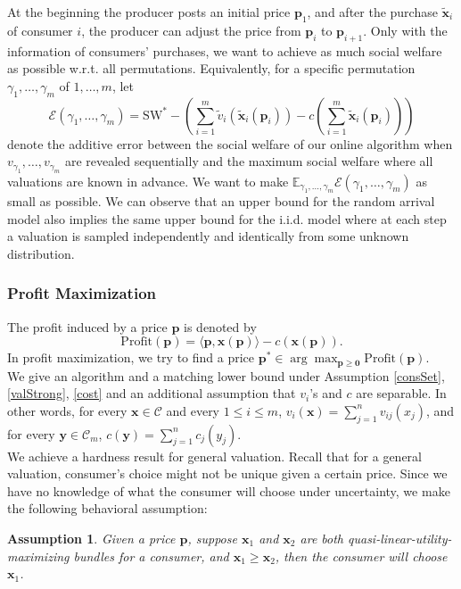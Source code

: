 \documentclass{article}
\newtheorem{assumption}{Assumption}[section]
\begin{document}
At the beginning the producer posts an initial price $\mathbf{p}_1$, and after the purchase $\tilde{\mathbf{x}}_i$ of consumer $i$, the producer can adjust the price from $\mathbf{p}_i$ to $\mathbf{p}_{i+1}$. Only with the information of consumers' purchases, we want to achieve as much social welfare as possible w.r.t. all permutations. Equivalently, for a specific permutation $\gamma_1,\ldots,\gamma_m$ of $1,\ldots,m$, let
\begin{equation}
    \mathcal{E}(\gamma_1,\ldots,\gamma_m)=\mathrm{SW}^*-\left(\sum_{i=1}^{m}\tilde{v}_i(\tilde{\mathbf{x}}_i(\mathbf{p}_i))-c\left(\sum_{i=1}^{m}\tilde{\mathbf{x}}_i(\mathbf{p}_i)\right)\right)
\end{equation}
denote the additive error between the social welfare of our online algorithm when $v_{\gamma_1},\ldots,v_{\gamma_m}$ are revealed sequentially and the maximum social welfare where all valuations are known in advance. We want to make $\mathbb{E}_{\gamma_1,\ldots,\gamma_m}\mathcal{E}(\gamma_1,\ldots,\gamma_m)$ as small as possible. We can observe that an upper bound for the random arrival model also implies the same upper bound for the i.i.d. model where at each step a valuation is sampled independently and identically from some unknown distribution.

\subsubsection{Profit Maximization}\label{profitMaxSection}
The profit induced by a price $\mathbf{p}$ is denoted by
\begin{equation}
    \mathrm{Profit}(\mathbf{p})=\langle \mathbf{p},\mathbf{x}(\mathbf{p})\rangle-c(\mathbf{x}(\mathbf{p})).
\end{equation}
In profit maximization, we try to find a price $\mathbf{p}^*\in\arg\max_{\mathbf{p}\ge \mathbf{0}}\mathrm{Profit}(\mathbf{p})$. \\

We give an algorithm and a matching lower bound under Assumption \ref{consSet}, \ref{valStrong}, \ref{cost} and an additional assumption that $v_i$'s and $c$ are separable. In other words, for every $\mathbf{x}\in \mathcal{C}$ and every $1\le i\le m$, $v_i(\mathbf{x})=\sum_{j=1}^{n}v_{ij}(x_j)$, and for every $\mathbf{y}\in \mathcal{C}_m$, $c(\mathbf{y})=\sum_{j=1}^{n}c_j(y_j)$.\\

We achieve a hardness result for general valuation. Recall that for a general valuation, consumer's choice might not be unique given a certain price. Since we have no knowledge of what the consumer will choose under uncertainty, we make the following behavioral assumption:
\begin{assumption}\label{behavior}
    Given a price $\mathbf{p}$, suppose $\mathbf{x}_1$ and $\mathbf{x}_2$ are both quasi-linear-utility-maximizing bundles for a consumer, and $\mathbf{x}_1\ge \mathbf{x}_2$, then the consumer will choose $\mathbf{x}_1$.
\end{assumption}
\end{document}
